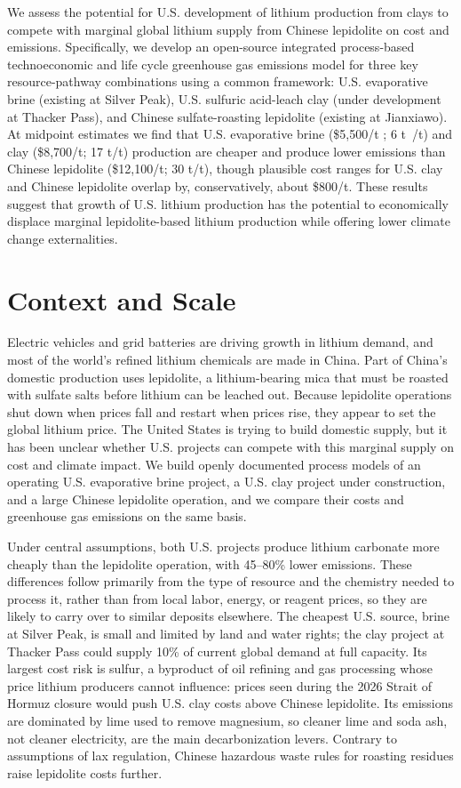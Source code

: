 \documentclass{article}
\renewcommand\_{\textunderscore\allowbreak}
\begin{document}
We assess the potential for U.S. development of lithium production from clays to compete with marginal global lithium supply from Chinese lepidolite on cost and emissions. Specifically, we develop an open-source integrated process-based technoeconomic and life cycle greenhouse gas emissions model for three key resource-pathway combinations using a common framework: U.S. evaporative brine (existing at Silver Peak), U.S. sulfuric acid-leach clay (under development at Thacker Pass), and Chinese sulfate-roasting lepidolite (existing at Jianxiawo). At midpoint estimates we find that U.S. evaporative brine (\$5,500/t ; 6 t~/t) and clay (\$8,700/t; 17 t/t) production are cheaper and produce lower emissions than Chinese lepidolite (\$12,100/t; 30 t/t), though plausible cost ranges for U.S. clay and Chinese lepidolite overlap by, conservatively, about \$800/t. These results suggest that growth of U.S. lithium production has the potential to economically displace marginal lepidolite-based lithium production while offering lower climate change externalities.

\section*{Context and Scale}
Electric vehicles and grid batteries are driving growth in lithium demand, and most of the world's refined lithium chemicals are made in China. Part of China's domestic production uses lepidolite, a lithium-bearing mica that must be roasted with sulfate salts before lithium can be leached out. Because lepidolite operations shut down when prices fall and restart when prices rise, they appear to set the global lithium price. The United States is trying to build domestic supply, but it has been unclear whether U.S. projects can compete with this marginal supply on cost and climate impact. We build openly documented process models of an operating U.S. evaporative brine project, a U.S. clay project under construction, and a large Chinese lepidolite operation, and we compare their costs and greenhouse gas emissions on the same basis.

Under central assumptions, both U.S. projects produce lithium carbonate more cheaply than the lepidolite operation, with 45--80\% lower emissions. These differences follow primarily from the type of resource and the chemistry needed to process it, rather than from local labor, energy, or reagent prices, so they are likely to carry over to similar deposits elsewhere. The cheapest U.S. source, brine at Silver Peak, is small and limited by land and water rights; the clay project at Thacker Pass could supply 10\% of current global demand at full capacity. Its largest cost risk is sulfur, a byproduct of oil refining and gas processing whose price lithium producers cannot influence: prices seen during the 2026 Strait of Hormuz closure would push U.S. clay costs above Chinese lepidolite. Its emissions are dominated by lime used to remove magnesium, so cleaner lime and soda ash, not cleaner electricity, are the main decarbonization levers. Contrary to assumptions of lax regulation, Chinese hazardous waste rules for roasting residues raise lepidolite costs further.
\end{document}

